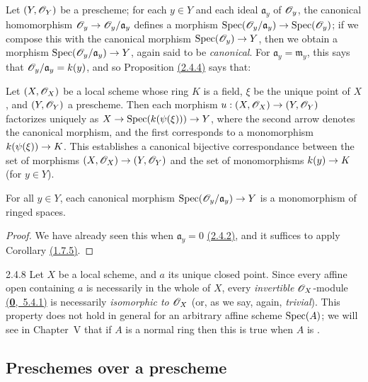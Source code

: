 Let $(Y,\mathscr{O}_Y)$ be a prescheme; for each $y\in Y$ and each ideal
$\mathfrak{a}_y$ of $\mathscr{O}_y$, the canonical homomorphism
$\mathscr{O}_y\to\mathscr{O}_y/\mathfrak{a}_y$ defines a morphism
${\mathop{\mathrm{Spec}}\nolimits}(\mathscr{O}_y/\mathfrak{a}_y)\to{\mathop{\mathrm{Spec}}\nolimits}(\mathscr{O}_y)$; if we compose this with the
canonical morphism ${\mathop{\mathrm{Spec}}\nolimits}(\mathscr{O}_y)\to Y$, then we obtain a morphism
${\mathop{\mathrm{Spec}}\nolimits}(\mathscr{O}_y/\mathfrak{a}_y)\to Y$, again said to be \textit{canonical}. For
$\mathfrak{a}_y=\mathfrak{m}_y$, this says that $\mathscr{O}_y/\mathfrak{a}_y=k(y)$, and
so Proposition \hyperref[prop-1.2.4.4]{(2.4.4)} says that:

\begin{cor}[2.4.6]
\label{cor-1.2.4.6}
Let $(X,\mathscr{O}_X)$ be a local scheme whose ring $K$ is a field, $\xi$ be the unique point of
$X$, and $(Y,\mathscr{O}_Y)$ a prescheme. Then each morphism $u:(X,\mathscr{O}_X)\to(Y,\mathscr{O}_Y)$ factorizes
uniquely as $X\to{\mathop{\mathrm{Spec}}\nolimits}(k(\psi(\xi)))\to Y$, where the second arrow denotes the canonical
morphism, and the first corresponds to a monomorphism $k(\psi(\xi))\to K$.
This establishes a canonical bijective correspondance between the set of
morphisms $(X,\mathscr{O}_X)\to (Y,\mathscr{O}_Y)$ and the set of monomorphisms $k(y)\to K$ (for
$y\in Y$).
\end{cor}

\begin{cor}[2.4.7]
\label{cor-1.2.4.7}
For all $y\in Y$, each canonical morphism
${\mathop{\mathrm{Spec}}\nolimits}(\mathscr{O}_y/\mathfrak{a}_y)\to Y$ is a monomorphism of ringed spaces.
\end{cor}

\begin{proof}
\label{proof-cor-1.2.4.7}
We have already seen this when $\mathfrak{a}_y=0$ \hyperref[prop-1.2.4.2]{(2.4.2)}, and it suffices
to apply Corollary \hyperref[cor-1.1.7.5]{(1.7.5)}.
\end{proof}

\begin{rmk}{2.4.8}
\label{rmk-1.2.4.8}
Let $X$ be a local scheme, and $a$ its unique
closed point. Since every affine open containing $a$ is necessarily in the
whole of $X$, every {\em invertible} $\mathscr{O}_X$-module \hyperref[env-0.5.4.1]{(\textbf{0},~5.4.1)} is
necessarily {\em isomorphic to $\mathscr{O}_X$} (or, as we say, again, {\em trivial}).
This property does not hold in general for an arbitrary affine scheme
${\mathop{\mathrm{Spec}}\nolimits}(A)$; we will see in Chapter~V that if $A$ is a normal ring then this is
true when $A$ is .
\end{rmk}

\subsection{Preschemes over a prescheme}
\label{subsection-preschemes-over-prescheme}

